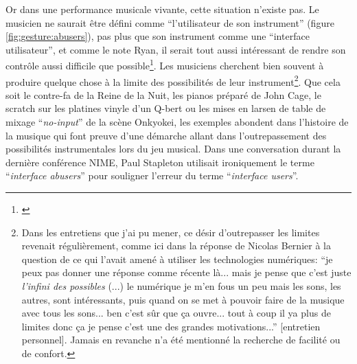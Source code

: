 \indent Or dans une performance musicale vivante, cette situation n'existe pas. Le musicien ne saurait être défini comme ``l'utilisateur de son instrument'' (figure \ref{fig:gesture:abusers}), pas plus que son instrument comme une ``interface utilisateur'', et comme le note Ryan, il serait tout aussi intéressant de rendre son contrôle aussi difficile que possible\footnote{ \cite{ryan_remarks_1991}}. Les musiciens cherchent bien souvent à produire quelque chose à la limite des possibilités de leur instrument\footnote{Dans les entretiens que j'ai pu mener, ce désir d'outrepasser les limites revenait régulièrement, comme ici dans la réponse de Nicolas Bernier à la question de ce qui l'avait amené à utiliser les technologies numériques: ``je peux pas donner une réponse comme récente là... mais je pense que c'est juste \textit{l'infini des possibles} (...) le numérique je m'en fous un peu mais les sons, les autres, sont intéressants, puis quand on se met à pouvoir faire de la musique avec tous les sons... ben c'est sûr que ça ouvre... tout à coup il ya plus de limites donc ça je pense c'est une des grandes motivations...'' [entretien personnel]. Jamais en revanche n'a été mentionné la recherche de facilité ou de confort.}.
Que cela soit le contre-fa de la Reine de la Nuit, les pianos préparé de John Cage, le scratch sur les platines vinyle d'un Q-bert ou les mises en larsen de table de mixage ``\textit{no-input}'' de la scène Onkyokei, les exemples abondent dans l'histoire de la musique qui font preuve d'une démarche allant dans l'outrepassement des possibilités instrumentales lors du jeu musical. Dans une conversation durant la dernière conférence \gls{NIME}, Paul Stapleton utilisait ironiquement le terme ``\textit{interface abusers}'' pour souligner l'erreur du terme ``\textit{interface users}''.\\
